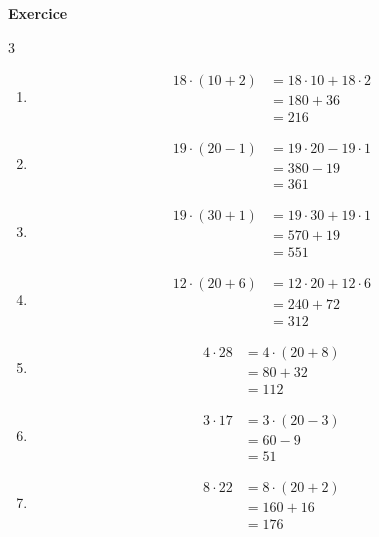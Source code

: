 \documentclass[10pt,a4paper]{article}
\newcounter{nexo}
\begin{document}
\pagebreak
\footnotesize
\setcounter{nexo}{1}
\textbf{Exercice \thenexo} 
\multicolsep\itemsep
\begin{multicols}{3}
	\begin{enumerate}
		\item 	\begin{align*} 
			18\cdot (10+2) &= 18 \cdot 10 + 18 \cdot 2 \\
		& = 180 + 36 \\
		& = 216
	\end{align*}
		\item \begin{align*}
			19 \cdot (20-1) &= 19 \cdot 20 - 19 \cdot 1 \\
			&= 380 - 19 \\
			&= 361
		\end{align*}
		\item \begin{align*}
			19\cdot (30+1) &= 19 \cdot 30 + 19 \cdot 1 \\
			&= 570 + 19 \\
			&= 551
		\end{align*}
		\item \begin{align*}
			12 \cdot (20+6) &= 12\cdot 20 + 12 \cdot 6 \\ 
			&= 240 + 72 \\
			&= 312
		\end{align*}
		\item \begin{align*}
			4 \cdot 28 &= 4 \cdot (20 + 8) \\
			&= 80 + 32 \\
			&= 112 
		\end{align*}
		\item \begin{align*}
			3 \cdot 17 &= 3 \cdot (20-3) \\
			&= 60 - 9 \\
			&= 51
		\end{align*}
		\item \begin{align*}
			8 \cdot 22 &= 8 \cdot (20+2)\\
			&= 160 + 16 \\
			&= 176
		\end{align*}

\end{enumerate}
\end{multicols}
\end{document}

